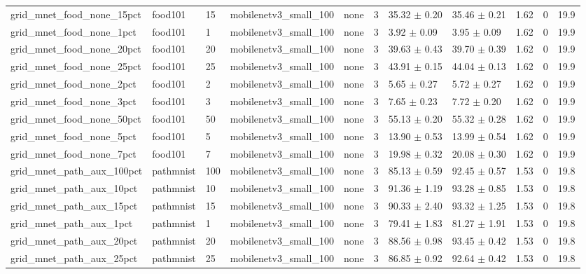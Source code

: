\begin{tabular}{lllllllllll}
grid_mnet_food_none_15pct & food101 & 15 & mobilenetv3_small_100 & none & 3 & 35.32 $\pm$ 0.20 & 35.46 $\pm$ 0.21 & 1.62 & 0 & 19.9 \\
grid_mnet_food_none_1pct & food101 & 1 & mobilenetv3_small_100 & none & 3 & 3.92 $\pm$ 0.09 & 3.95 $\pm$ 0.09 & 1.62 & 0 & 19.9 \\
grid_mnet_food_none_20pct & food101 & 20 & mobilenetv3_small_100 & none & 3 & 39.63 $\pm$ 0.43 & 39.70 $\pm$ 0.39 & 1.62 & 0 & 19.9 \\
grid_mnet_food_none_25pct & food101 & 25 & mobilenetv3_small_100 & none & 3 & 43.91 $\pm$ 0.15 & 44.04 $\pm$ 0.13 & 1.62 & 0 & 19.9 \\
grid_mnet_food_none_2pct & food101 & 2 & mobilenetv3_small_100 & none & 3 & 5.65 $\pm$ 0.27 & 5.72 $\pm$ 0.27 & 1.62 & 0 & 19.9 \\
grid_mnet_food_none_3pct & food101 & 3 & mobilenetv3_small_100 & none & 3 & 7.65 $\pm$ 0.23 & 7.72 $\pm$ 0.20 & 1.62 & 0 & 19.9 \\
grid_mnet_food_none_50pct & food101 & 50 & mobilenetv3_small_100 & none & 3 & 55.13 $\pm$ 0.20 & 55.32 $\pm$ 0.28 & 1.62 & 0 & 19.9 \\
grid_mnet_food_none_5pct & food101 & 5 & mobilenetv3_small_100 & none & 3 & 13.90 $\pm$ 0.53 & 13.99 $\pm$ 0.54 & 1.62 & 0 & 19.9 \\
grid_mnet_food_none_7pct & food101 & 7 & mobilenetv3_small_100 & none & 3 & 19.98 $\pm$ 0.32 & 20.08 $\pm$ 0.30 & 1.62 & 0 & 19.9 \\
grid_mnet_path_aux_100pct & pathmnist & 100 & mobilenetv3_small_100 & none & 3 & 85.13 $\pm$ 0.59 & 92.45 $\pm$ 0.57 & 1.53 & 0 & 19.8 \\
grid_mnet_path_aux_10pct & pathmnist & 10 & mobilenetv3_small_100 & none & 3 & 91.36 $\pm$ 1.19 & 93.28 $\pm$ 0.85 & 1.53 & 0 & 19.8 \\
grid_mnet_path_aux_15pct & pathmnist & 15 & mobilenetv3_small_100 & none & 3 & 90.33 $\pm$ 2.40 & 93.32 $\pm$ 1.25 & 1.53 & 0 & 19.8 \\
grid_mnet_path_aux_1pct & pathmnist & 1 & mobilenetv3_small_100 & none & 3 & 79.41 $\pm$ 1.83 & 81.27 $\pm$ 1.91 & 1.53 & 0 & 19.8 \\
grid_mnet_path_aux_20pct & pathmnist & 20 & mobilenetv3_small_100 & none & 3 & 88.56 $\pm$ 0.98 & 93.45 $\pm$ 0.42 & 1.53 & 0 & 19.8 \\
grid_mnet_path_aux_25pct & pathmnist & 25 & mobilenetv3_small_100 & none & 3 & 86.85 $\pm$ 0.92 & 92.64 $\pm$ 0.42 & 1.53 & 0 & 19.8 \\

\end{tabular}

